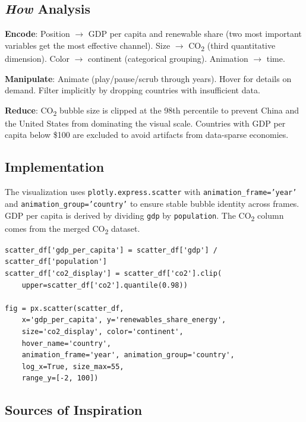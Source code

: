 \documentclass[10pt]{article}
\begin{document}
\subsection{\emph{How} Analysis}

\textbf{Encode}: Position $\rightarrow$ GDP per capita and renewable share (two most important variables get the most effective channel). Size $\rightarrow$ CO\textsubscript{2} (third quantitative dimension). Color $\rightarrow$ continent (categorical grouping). Animation $\rightarrow$ time.

\textbf{Manipulate}: Animate (play/pause/scrub through years). Hover for details on demand. Filter implicitly by dropping countries with insufficient data.

\textbf{Reduce}: CO\textsubscript{2} bubble size is clipped at the 98th percentile to prevent China and the United States from dominating the visual scale. Countries with GDP per capita below \$100 are excluded to avoid artifacts from data-sparse economies.

\subsection{Implementation}

The visualization uses \texttt{plotly.express.scatter} with \texttt{animation\_frame='year'} and \texttt{animation\_group='country'} to ensure stable bubble identity across frames. GDP per capita is derived by dividing \texttt{gdp} by \texttt{population}. The CO\textsubscript{2} column comes from the merged CO\textsubscript{2} dataset.

\begin{lstlisting}[caption={Animated scatterplot construction (simplified)},label=lst:scatter]
scatter_df['gdp_per_capita'] = scatter_df['gdp'] / scatter_df['population']
scatter_df['co2_display'] = scatter_df['co2'].clip(
    upper=scatter_df['co2'].quantile(0.98))

fig = px.scatter(scatter_df,
    x='gdp_per_capita', y='renewables_share_energy',
    size='co2_display', color='continent',
    hover_name='country',
    animation_frame='year', animation_group='country',
    log_x=True, size_max=55,
    range_y=[-2, 100])
\end{lstlisting}

\subsection{Sources of Inspiration}
\end{document}
